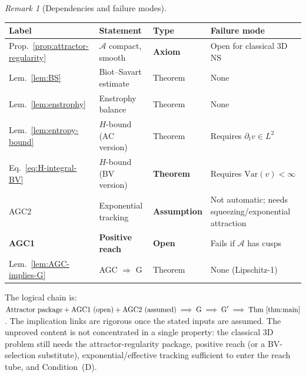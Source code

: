 \documentclass[12pt,a4paper]{article}
\theoremstyle{definition}
\theoremstyle{plain}
\theoremstyle{remark}
\newtheorem{remark}[definition]{Remark}
\begin{document}
\begin{remark}[Dependencies and failure modes]\label{rem:dependencies}
\mbox{}

\begin{center}
\begin{tabularx}{\textwidth}{@{}lYlY@{}}
\hline
\textbf{Label} & \textbf{Statement} & \textbf{Type} & \textbf{Failure mode} \\
\hline
Prop.~\ref{prop:attractor-regularity} &
  $\mathcal{A}$ compact, smooth &
  \textbf{Axiom} & Open for classical 3D NS \\
Lem.~\ref{lem:BS} &
  Biot--Savart estimate &
  Theorem & None \\
Lem.~\ref{lem:enstrophy} &
  Enstrophy balance &
  Theorem & None \\
Lem.~\ref{lem:entropy-bound} &
  $H$-bound (AC version) &
  Theorem & Requires $\partial_t v \in L^2$ \\
Eq.~\eqref{eq:H-integral-BV} &
  $H$-bound (BV version) &
  \textbf{Theorem} & Requires $\mathrm{Var}(v) < \infty$ \\
AGC2 &
  Exponential tracking &
  \textbf{Assumption} & Not automatic; needs squeezing/exponential attraction \\
\textbf{AGC1} &
  \textbf{Positive reach} &
  \textbf{Open} &
  Fails if $\mathcal{A}$ has cusps \\
Lem.~\ref{lem:AGC-implies-G} &
  AGC $\Rightarrow$ G &
  Theorem & None (Lipschitz-1) \\
\hline
\end{tabularx}
\end{center}

\medskip\noindent
The logical chain is:
$\textup{Attractor package} + \textup{AGC1 (open)} + \textup{AGC2 (assumed)}
\;\Longrightarrow\;
\textup{G}
\;\Longrightarrow\;
\textup{G}'
\;\Longrightarrow\;
\textup{Thm~\ref{thm:main}}$.
The implication links are rigorous once the stated inputs are assumed.
The unproved content is not concentrated in a single property: the
classical 3D problem still needs the attractor-regularity package,
positive reach (or a BV-selection substitute), exponential/effective
tracking sufficient to enter the reach tube, and Condition~(D).
\end{remark}
\end{document}
